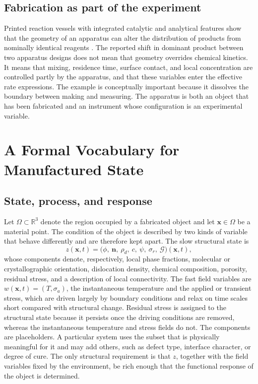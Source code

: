 \documentclass[11pt]{article}
\theoremstyle{definition}
\newcommand{\R}{\mathbb{R}}
\begin{document}
\subsection{Fabrication as part of the experiment}

Printed reaction vessels with integrated catalytic and analytical features show that the geometry of an apparatus can alter the distribution of products from nominally identical reagents \cite{symes2012}. The reported shift in dominant product between two apparatus designs does not mean that geometry overrides chemical kinetics. It means that mixing, residence time, surface contact, and local concentration are controlled partly by the apparatus, and that these variables enter the effective rate expressions. The example is conceptually important because it dissolves the boundary between making and measuring. The apparatus is both an object that has been fabricated and an instrument whose configuration is an experimental variable.

\section{A Formal Vocabulary for Manufactured State}

\subsection{State, process, and response}

Let $\Omega\subset\R^3$ denote the region occupied by a fabricated object and let $\mathbf{x}\in\Omega$ be a material point. The condition of the object is described by two kinds of variable that behave differently and are therefore kept apart. The slow structural state is
\begin{equation}
z(\mathbf{x},t)=\bigl(\phi,\ \mathbf{n},\ \rho_d,\ c,\ \psi,\ \sigma_r,\ \mathcal{G}\bigr)(\mathbf{x},t),
\end{equation}
whose components denote, respectively, local phase fractions, molecular or crystallographic orientation, dislocation density, chemical composition, porosity, residual stress, and a description of local connectivity. The fast field variables are $w(\mathbf{x},t)=(T,\sigma_a)$, the instantaneous temperature and the applied or transient stress, which are driven largely by boundary conditions and relax on time scales short compared with structural change. Residual stress is assigned to the structural state because it persists once the driving conditions are removed, whereas the instantaneous temperature and stress fields do not. The components are placeholders. A particular system uses the subset that is physically meaningful for it and may add others, such as defect type, interface character, or degree of cure. The only structural requirement is that $z$, together with the field variables fixed by the environment, be rich enough that the functional response of the object is determined.
\end{document}
